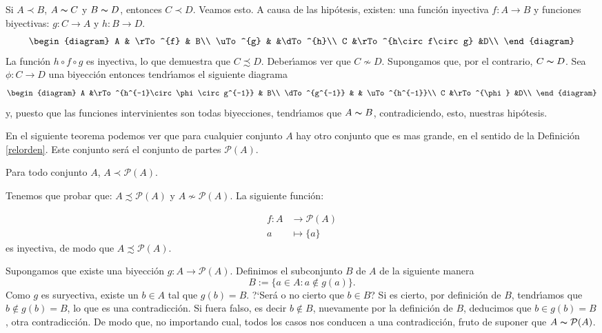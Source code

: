 \begin{ejemplo} Si $A\prec B$, $A\thicksim C$ y
$B\thicksim D$, entonces $C\prec D$. Veamos esto. A causa de las
hip\'otesis, existen: una funci\'on inyectiva $f:A\longrightarrow
B$ y funciones biyectivas: $g:C\longrightarrow A$ y
$h:B\longrightarrow D$.
\[
    \begin{diagram}
      A         & \rTo^{f}                  & B\\
       \uTo^{g} &                            &\dTo^{h}\\
       C        &\rTo^{h\circ f\circ g}                    &D\\
       \end{diagram}
       \]
La funci\'on $h\circ f \circ g$ es inyectiva, lo que demuestra que
$C\precsim D$. Deber\'{\i}amos ver que $C\nsim D$. Supongamos que,
por el contrario, $C\thicksim D$. Sea $\phi:C\longrightarrow D$
una biyecci\'on entonces tendr\'{\i}amos el siguiente diagrama
\[
    \begin{diagram}
      A             &\rTo^{h^{-1}\circ\phi\circ g^{-1}}     & B\\
      \dTo^{g^{-1}} &                                       & \uTo^{h^{-1}}\\
      C              &\rTo^{\phi}                            &D\\
       \end{diagram}
       \]
y, puesto que las funciones intervinientes son todas biyecciones,
tendr\'{\i}amos que $A\thicksim B$, contradiciendo, esto, nuestras
hip\'otesis.
\end{ejemplo}

En el siguiente teorema podemos ver que para cualquier conjunto
$A$ hay otro conjunto que es mas grande, en el sentido de la
Definici\'on \vref{relorden}. Este conjunto ser\'a el conjunto de
partes $\mathcal{P}(A)$.

\begin{teorema}[Cantor]\label{teorcantor} Para todo conjunto $A$, $A\prec\mathcal{P}(A)$.
\end{teorema}
\begin{demo} Tenemos que probar que: $A\precsim\mathcal{P}(A)$ y
$A\nsim\mathcal{P}(A)$. La siguiente funci\'on:

\[\begin{split}
        f:A&\longrightarrow\mathcal{P}(A)\\
          a&\longmapsto \{a\}
  \end{split}
\]
es inyectiva, de modo que $A\precsim\mathcal{P}(A)$.

Supongamos que existe una biyecci\'on
$g:A\longrightarrow\mathcal{P}(A)$. Definimos el subconjunto $B$
de $A$ de la siguiente manera
\[B:=\{a\in A:a\notin g(a)\}.\]
Como $g$ es suryectiva, existe un $b\in A$ tal que $g(b)=B$.
?`Ser\'a o no cierto que $b\in B$? Si es cierto, por definici\'on
de $B$, tendr\'{\i}amos que $b\notin g(b)=B$, lo que es una
contradicci\'on. Si fuera falso, es decir $b\notin B$, nuevamente
por la definici\'on de $B$, deducimos que $b\in g(b)=B$, otra
contradicci\'on. De modo que, no importando cual, todos los casos
nos conducen a una contradicci\'on, fruto de suponer que
$A\thicksim\mathcal{P}(A)$.
\end{demo}

